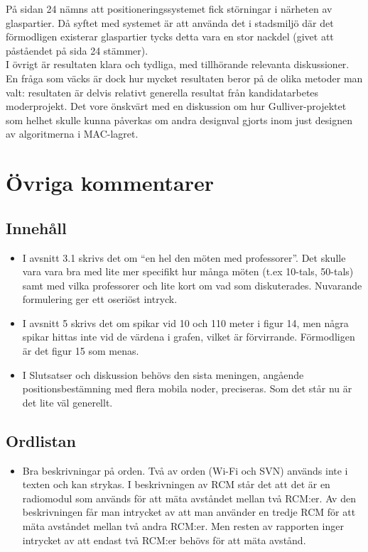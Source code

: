\documentclass[a4paper,11pt]{article}
\begin{document}
På sidan 24 nämns att positioneringssystemet fick störningar i närheten av glaspartier. Då syftet med systemet är att använda det i stadsmiljö där det förmodligen existerar glaspartier tycks detta vara en stor nackdel (givet att påståendet på sida 24 stämmer). \\

I övrigt är resultaten klara och tydliga, med tillhörande relevanta diskussioner. En fråga som väcks är dock hur mycket resultaten beror på de olika metoder man valt: resultaten är delvis relativt generella resultat från kandidatarbetes moderprojekt. Det vore önskvärt med en diskussion om hur Gulliver-projektet som helhet skulle kunna påverkas om andra designval gjorts inom just designen av algoritmerna i MAC-lagret. \\

\section{Övriga kommentarer}

\subsection{Innehåll}

\begin{itemize}
   \item I avsnitt 3.1 skrivs det om “en hel den möten med professorer”. Det skulle vara vara bra med lite mer specifikt hur många möten (t.ex 10-tals, 50-tals) samt med vilka professorer och lite kort om vad som diskuterades. Nuvarande formulering ger ett oseriöst intryck.
   \item I avsnitt 5 skrivs det om spikar vid 10 och 110 meter i figur 14, men några spikar hittas inte vid de värdena i grafen, vilket är förvirrande. Förmodligen är det figur 15 som menas.
   \item I Slutsatser och diskussion behövs den sista meningen, angående positionsbestämning med flera mobila noder, preciseras. Som det står nu är det lite väl generellt. 
\end{itemize}

\subsection{Ordlistan}

\begin{itemize}
   \item Bra beskrivningar på orden. Två av orden (Wi-Fi och SVN) används inte i texten och kan strykas. I beskrivningen av RCM står det att det är en radiomodul som används för att mäta avståndet mellan två RCM:er. Av den beskrivningen får man intrycket av att man använder en tredje RCM för att mäta avståndet mellan två andra RCM:er. Men resten av rapporten inger intrycket av att endast två RCM:er behövs för att mäta avstånd.
\end{itemize}
\end{document}
